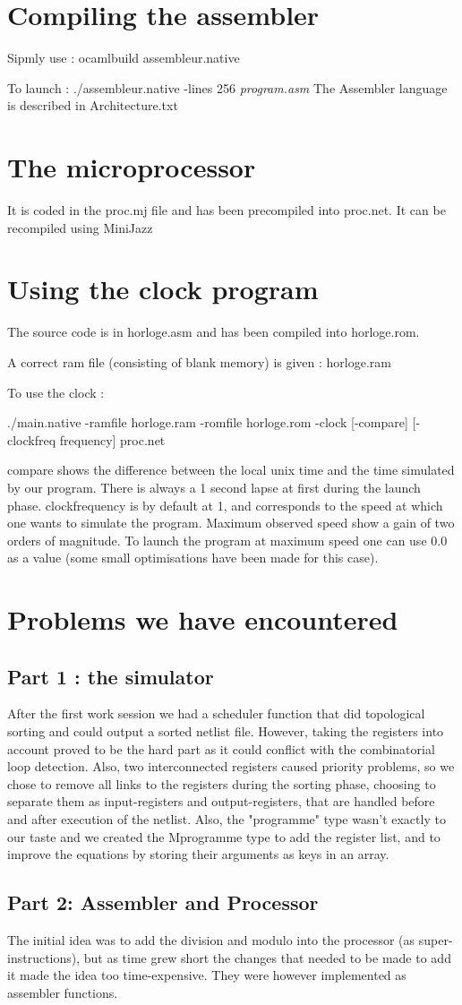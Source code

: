 \documentclass[a4paper]{article}
\begin{document}
\section{Compiling the assembler}
Sipmly use : ocamlbuild assembleur.native

To launch :  ./assembleur.native -lines 256 \textit{program.asm}
\newline
\newline
The Assembler language is described in Architecture.txt 

\section{The microprocessor}
It is coded in the proc.mj file and has been precompiled into proc.net. It can be recompiled using MiniJazz

\section{Using the clock program}
The source code is in horloge.asm and has been compiled into horloge.rom.

A correct ram file (consisting of blank memory) is given : horloge.ram

To use the clock :

./main.native -ramfile horloge.ram -romfile horloge.rom -clock [-compare] [-clockfreq
frequency] proc.net 

compare shows the difference between the local unix time and the time simulated by our program. There is always a 1 second lapse at first during the launch phase.
clockfrequency is by default at 1, and corresponds to the speed at which one wants to simulate the program. Maximum observed speed show a gain of two orders of magnitude. To launch the program at maximum speed one can use 0.0 as a value (some small optimisations have been made for this case).

\section{Problems we have encountered}
\subsection{Part 1 : the simulator}
After the first work session we had a scheduler function that did topological sorting and could output a sorted netlist file. However, taking the registers into account proved to be the hard part as it could conflict with the combinatorial loop detection. Also, two interconnected registers caused priority problems, so we chose to remove all links to the registers during the sorting phase, choosing to separate them as input-registers and output-registers, that are handled before and after execution of the netlist.  
Also, the "programme" type wasn't exactly to our taste and we created the Mprogramme type to add the register list, and to improve the equations by storing their arguments as keys in an array.

\subsection{Part 2: Assembler and Processor}

The initial idea was to add the division and modulo into the processor (as super-instructions), but as time grew short the changes that needed to be made to add it made the idea too time-expensive. 
They were however implemented as assembler functions. 
\end{document}
